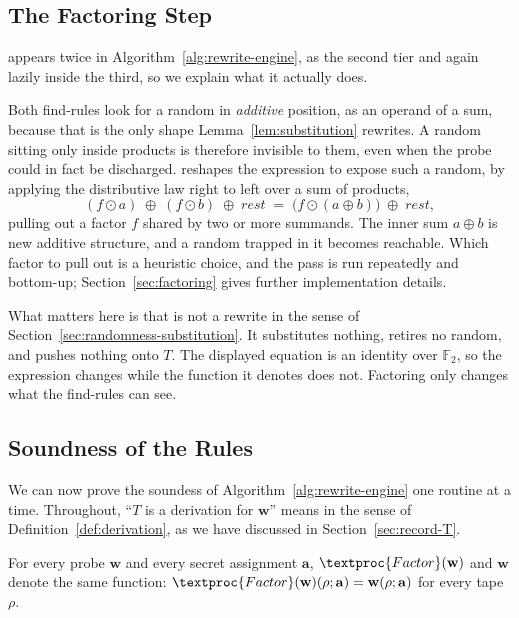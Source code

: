   \subsection{The Factoring Step}
  \label{sec:factoring-step}

   appears twice in Algorithm~\ref{alg:rewrite-engine}, as the
  second tier and again lazily inside the third, so we explain what
  it actually does.

  Both find-rules look for a random in \emph{additive} position, as an operand of a
  sum, because that is the only shape Lemma~\ref{lem:substitution} rewrites. A
  random sitting only inside products is therefore invisible to them, even when the
  probe could in fact be discharged.  reshapes the expression to
  expose such a random, by applying the distributive law right to left over a sum of
  products,
  \[
    (f \odot a) \;\oplus\; (f \odot b) \;\oplus\; \mathit{rest}
    \;=\;
    \big(f \odot (a \oplus b)\big) \;\oplus\; \mathit{rest} ,
  \]
  pulling out a factor $f$ shared by two or more summands. The inner sum
  $a \oplus b$ is new additive structure, and a random trapped in it becomes
  reachable. Which factor to pull out is a heuristic choice, and the pass is run
  repeatedly and bottom-up; Section~\ref{sec:factoring} gives further implementation
  details.

  What matters here is that  is not a rewrite in the sense of
  Section~\ref{sec:randomness-substitution}. It substitutes nothing, retires no
  random, and pushes nothing onto $T$. The displayed equation is an identity over
  $\mathbb{F}_2$, so the expression changes while the function it denotes does not.
  Factoring only changes what the find-rules can see.

  \subsection{Soundness of the Rules}
  \label{sec:rule-soundness}

  We can now prove the soundess of Algorithm~\ref{alg:rewrite-engine} one
  routine at a time. Throughout, ``$T$ is a derivation
  for $\mathbf{w}$'' means in the sense of Definition~\ref{def:derivation}, as
  we have discussed in Section~\ref{sec:record-T}.

  \begin{lemma}
  \label{lem:factor-sound}
  For every probe $\mathbf{w}$ and every secret assignment $\mathbf{a}$,
  $\textproc{Factor}(\mathbf{w})$ and $\mathbf{w}$ denote the same function:
  $\textproc{Factor}(\mathbf{w})(\rho; \mathbf{a}) = \mathbf{w}(\rho; \mathbf{a})$
  for every tape $\rho$.
  \end{lemma}

